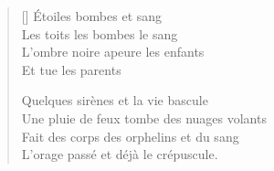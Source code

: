 \settowidth{\versewidth}{Une pluie de feux tombe des nuages volants}
\begin{verse}[\versewidth]
Étoiles bombes et sang \\
Les toits les bombes le sang \\
L'ombre noire apeure les enfants \\
Et tue les parents

Quelques sirènes et la vie bascule \\
Une pluie de feux tombe des nuages volants \\
Fait des corps des orphelins et du sang \\
L'orage passé et déjà le crépuscule.
\end{verse}







